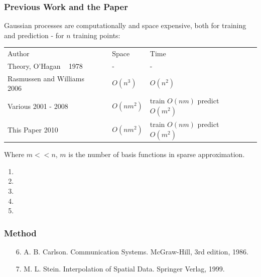 \documentclass[12pt]{beamer}
\begin{document}
\begin{frame}
	\frametitle{Previous Work and the Paper}
	Gaussian processes are computationally and space expensive, both for training and prediction - for $n$ training points:

	\begin{table}
	  \begin{footnotesize}
	  \begin{center}
	  \begin{tabular}{llll}
		Author & Space & Time \\
		Theory, O'Hagan ~\cite{o1978curve} 1978 & - & - \\
		Rasmussen and Williams ~\cite{rasmussen2006gpfml} 2006 & $O(n^{3})$ & $O(n^{2})$ \\
		Various 2001 - 2008  \cite{snelson2005sgppi} \cite{tresp2000bcm} \cite{walder2008sparse} & $O(nm^{2})$ & train $O(nm)$ predict $O(m^{2})$  \\
		This Paper 2010& $O(nm^{2})$ & train $O(nm)$ predict $O(m^{2})$ \\
	  \end{tabular}
	  \end{center}
	  \end{footnotesize}
	\end{table}
	Where $m << n$, $m$ is the number of basis functions in sparse approximation.
	\begin{tiny}
	\begin{enumerate}
		\item {}
		\item {}
		\item {}
		\item {}
		\item {}
	\end{enumerate}
	\end{tiny}
\end{frame}

\begin{frame}
  \frametitle{Method}
  \begin{figure}
  	\def \svgwidth{0.85\columnwidth}
  	
  \end{figure}
  \begin{tiny}
  \begin{enumerate}
  	\item[6.] A. B. Carlson. Communication Systems. McGraw-Hill, 3rd edition, 1986.
	\item[7.] M. L. Stein. Interpolation of Spatial Data. Springer Verlag, 1999.
  \end{enumerate}
  \end{tiny}
\end{frame}
\end{document}
